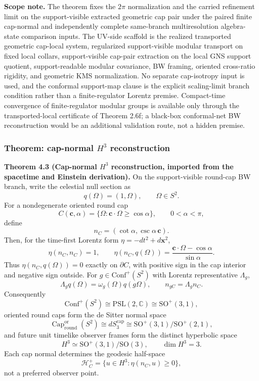 \textbf{Scope note.} The theorem fixes the \(2\pi\) normalization and the carried refinement limit on the support-visible extracted geometric cap pair under the paired finite cap-normal and independently complete same-branch multiresolution algebra-state comparison inputs. The UV-side scaffold is the realized transported geometric cap-local system, regularized support-visible modular transport on fixed local collars, support-visible cap-pair extraction on the local GNS support quotient, support-readable modular covariance, BW framing, oriented cross-ratio rigidity, and geometric KMS normalization. No separate cap-isotropy input is used, and the conformal support-map clause is the explicit scaling-limit branch condition rather than a finite-regulator Lorentz premise. Compact-time convergence of finite-regulator modular groups is available only through the transported-local certificate of Theorem 2.6f; a black-box conformal-net BW reconstruction would be an additional validation route, not a hidden premise.
\subsubsection{\texorpdfstring{Theorem: cap-normal \(H^3\) reconstruction}{4.3 Theorem: cap-normal H3 reconstruction}}\label{43-theorem-mathrmbw_s2-implies-lorentz-kinematics}

\textbf{Theorem 4.3 (Cap-normal \(H^3\) reconstruction, imported from the spacetime and Einstein derivation).}
On the support-visible round-cap BW branch, write the celestial null section as
\[
q(\Omega)=(1,\Omega),\qquad \Omega\in S^2.
\]
For a nondegenerate oriented round cap
\[
C(\mathbf c,\alpha)=\{\Omega:\mathbf c\cdot\Omega\geq\cos\alpha\},
\qquad 0<\alpha<\pi,
\]
define
\[
n_C=(\cot\alpha,\csc\alpha\,\mathbf c).
\]
Then, for the time-first Lorentz form \(\eta=-dt^2+d\mathbf x^2\),
\[
\eta(n_C,n_C)=1,
\qquad
\eta(n_C,q(\Omega))
=
\frac{\mathbf c\cdot\Omega-\cos\alpha}{\sin\alpha}.
\]
Thus \(\eta(n_C,q(\Omega))=0\) exactly on \(\partial C\), with positive
sign in the cap interior and negative sign outside. For
\(g\in\mathrm{Conf}^+(S^2)\) with Lorentz representative \(\Lambda_g\),
\[
\Lambda_gq(\Omega)=\omega_g(\Omega)q(g\Omega),
\qquad
n_{gC}=\Lambda_gn_C.
\]
Consequently
\[
\mathrm{Conf}^+(S^2)\cong \mathrm{PSL}(2,\mathbb C)\cong \mathrm{SO}^+(3,1),
\]
oriented round caps form the de Sitter normal space
\[
\operatorname{Cap}^{\mathrm{or}}_{\mathrm{round}}(S^2)
\cong
dS_3^{\mathrm{cap}}
\cong
\mathrm{SO}^+(3,1)/\mathrm{SO}^+(2,1),
\]
and future unit timelike observer frames form the distinct hyperbolic space
\[
H^3\simeq \mathrm{SO}^+(3,1)/\mathrm{SO}(3),
\qquad
\dim H^3=3.
\]
Each cap normal determines the geodesic half-space
\[
\mathcal H_C^+=\{u\in H^3:\eta(n_C,u)\geq0\},
\]
not a preferred observer point.

